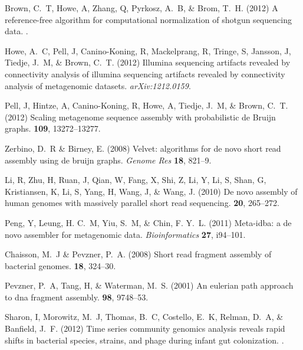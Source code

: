 \documentclass{pnastwo}
\begin{document}
\begin{article}
\begin{thebibliography}{10}
 Brown, C.~T, Howe, A, Zhang, Q, Pyrkosz, A.~B, \& Brom,
T.~H. \newblock (2012) A reference-free algorithm for computational
normalization of shotgun sequencing data. .

 Howe, A.~C, Pell, J, Canino-Koning, R, Mackelprang, R,
Tringe, S, Jansson, J, Tiedje, J.~M, \& Brown, C.~T. \newblock (2012) Illumina
sequencing artifacts revealed by connectivity analysis of illumina sequencing
artifacts revealed by connectivity analysis of metagenomic datasets. \newblock
{\em arXiv:1212.0159}.

 Pell, J, Hintze, A, Canino-Koning, R, Howe, A, Tiedje,
J.~M, \& Brown, C.~T. \newblock (2012) {Scaling metagenome sequence assembly
with probabilistic de Bruijn graphs}.  {\bf 109}, 13272--13277.

 Zerbino, D.~R \& Birney, E. \newblock (2008) Velvet:
algorithms for de novo short read assembly using de bruijn graphs. \newblock
{\em Genome Res} {\bf 18}, 821--9.

 Li, R, Zhu, H, Ruan, J, Qian, W, Fang, X, Shi, Z, Li, Y, Li,
S, Shan, G, Kristiansen, K, Li, S, Yang, H, Wang, J, \& Wang, J. \newblock
(2010) {De novo assembly of human genomes with massively parallel short read
sequencing}.  {\bf 20}, 265--272.

 Peng, Y, Leung, H. C.~M, Yiu, S.~M, \& Chin, F. Y.~L.
\newblock (2011) Meta-idba: a de novo assembler for metagenomic data. \newblock
{\em Bioinformatics} {\bf 27}, i94--101.

 Chaisson, M.~J \& Pevzner, P.~A. \newblock (2008)
Short read fragment assembly of bacterial genomes.  {\bf 18}, 324--30.

 Pevzner, P.~A, Tang, H, \& Waterman, M.~S. \newblock
(2001) An eulerian path approach to dna fragment assembly.  {\bf 98}, 9748--53.

 Sharon, I, Morowitz, M.~J, Thomas, B.~C, Costello, E.~K,
Relman, D.~A, \& Banfield, J.~F. \newblock (2012) {Time series community
genomics analysis reveals rapid shifts in bacterial species, strains, and phage
during infant gut colonization}. .


\end{thebibliography}
\end{article}
\end{document}
